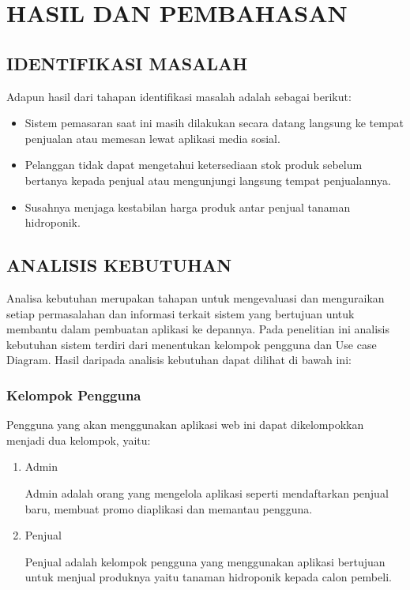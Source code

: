 \fancyhf{} 
\fancyfoot[C]{\thepage}
\chapter{HASIL DAN PEMBAHASAN}

\section{\uppercase{Identifikasi Masalah}}
Adapun hasil dari tahapan identifikasi masalah adalah sebagai berikut:

\begin{itemize}
	\item Sistem pemasaran saat ini masih dilakukan secara datang langsung ke tempat penjualan atau memesan lewat aplikasi media sosial.
	\item Pelanggan tidak dapat mengetahui ketersediaan stok produk sebelum bertanya kepada penjual atau mengunjungi langsung tempat penjualannya.
	\item Susahnya menjaga kestabilan harga produk antar penjual tanaman hidroponik.
\end{itemize}

\section{\uppercase{Analisis Kebutuhan}}
Analisa kebutuhan merupakan tahapan untuk mengevaluasi dan menguraikan setiap permasalahan dan informasi terkait sistem yang bertujuan untuk membantu dalam pembuatan aplikasi ke depannya. Pada penelitian ini analisis kebutuhan sistem
terdiri dari menentukan kelompok pengguna dan Use case Diagram. Hasil daripada analisis kebutuhan dapat dilihat di bawah ini:

\subsection{Kelompok Pengguna}
Pengguna yang akan menggunakan aplikasi web ini dapat dikelompokkan menjadi dua kelompok, yaitu:

\begin{enumerate}
	\item Admin
		\par Admin adalah orang yang mengelola aplikasi seperti mendaftarkan penjual baru, membuat promo diaplikasi dan memantau pengguna.
	
	\item Penjual
		 \par Penjual adalah kelompok pengguna yang menggunakan aplikasi bertujuan untuk menjual produknya yaitu tanaman hidroponik kepada calon pembeli.
\end{enumerate}

